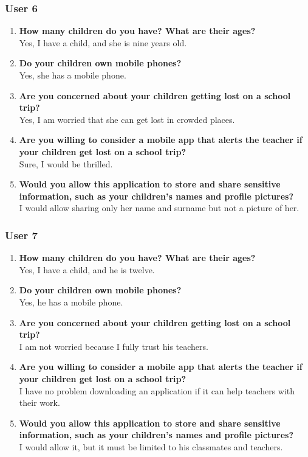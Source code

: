 \subsubsection*{User 6}
\begin{enumerate}
\item \textbf{How many children do you have? What are their ages?}
\\ Yes, I have a child, and she is nine years old.
\item \textbf{Do your children own mobile phones?}
\\ Yes, she has a mobile phone.
\item \textbf{Are you concerned about your children getting lost on a school trip?}
\\ Yes, I am worried that she can get lost in crowded places.
\item \textbf{Are you willing to consider a mobile app that alerts the teacher if your children get lost on a school trip?}
\\ Sure, I would be thrilled.
\item \textbf{Would you allow this application to store and share sensitive information, such as your children's names and profile pictures?}
\\ I would allow sharing only her name and surname but not a picture of her.
\end{enumerate}

\subsubsection*{User 7}
\begin{enumerate}
\item \textbf{How many children do you have? What are their ages?}
\\ Yes, I have a child, and he is twelve.
\item \textbf{Do your children own mobile phones?}
\\ Yes, he has a mobile phone.
\item \textbf{Are you concerned about your children getting lost on a school trip?}
\\ I am not worried because I fully trust his teachers. 
\item \textbf{Are you willing to consider a mobile app that alerts the teacher if your children get lost on a school trip?}
\\ I have no problem downloading an application if it can help teachers with their work.
\item \textbf{Would you allow this application to store and share sensitive information, such as your children's names and profile pictures?}
\\ I would allow it, but it must be limited to his classmates and teachers.
\end{enumerate}
